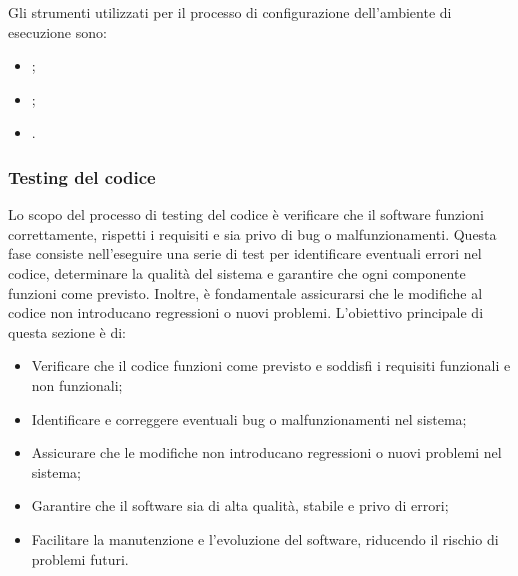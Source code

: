 Gli strumenti utilizzati per il processo di configurazione dell'ambiente di esecuzione sono:
\begin{itemize}
    \item {};
    \item {};
    \item {}.
\end{itemize}

\subsubsection{Testing del codice}
Lo scopo del processo di testing del codice è verificare che il software funzioni correttamente, rispetti i requisiti e sia privo di bug o malfunzionamenti. Questa fase consiste nell'eseguire una serie di test per identificare eventuali errori nel codice, determinare la qualità del sistema e garantire che ogni componente funzioni come previsto. Inoltre, è fondamentale assicurarsi che le modifiche al codice non introducano regressioni o nuovi problemi. L'obiettivo principale di questa sezione è di:
\begin{itemize}
    \item Verificare che il codice funzioni come previsto e soddisfi i requisiti funzionali e non funzionali;
    \item Identificare e correggere eventuali bug o malfunzionamenti nel sistema;
    \item Assicurare che le modifiche non introducano regressioni o nuovi problemi nel sistema;
    \item Garantire che il software sia di alta qualità, stabile e privo di errori;
    \item Facilitare la manutenzione e l'evoluzione del software, riducendo il rischio di problemi futuri.
\end{itemize}

